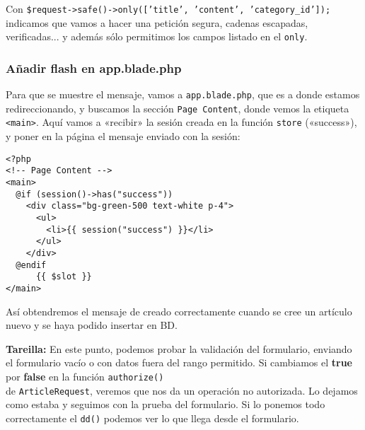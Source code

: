\documentclass[11pt]{article}
\begin{document}
Con \texttt{\$request->safe()->only(['title', 'content', 'category\_id']);}
indicamos que vamos a hacer una petición segura, cadenas escapadas,
verificadas... y además sólo permitimos los campos listado en el
\texttt{only}.


\subsubsection{Añadir flash en app.blade.php}
\label{sec:org750f89d}
Para que se muestre el mensaje, vamos a \texttt{app.blade.php}, que es a
donde estamos redireccionando, y buscamos la sección \texttt{Page Content},
donde vemos la etiqueta \texttt{<main>}. Aquí vamos a «recibir» la sesión
creada en la función \texttt{store} («success»), y poner en la página el
mensaje enviado con la sesión:
\begin{verbatim}
<?php
<!-- Page Content -->
<main>
  @if (session()->has("success"))
    <div class="bg-green-500 text-white p-4">
      <ul>
        <li>{{ session("success") }}</li>
      </ul>
    </div>
  @endif
      {{ $slot }}
</main>
\end{verbatim}

Así obtendremos el mensaje de creado correctamente cuando se cree un
artículo nuevo y se haya podido insertar en BD.



\textbf{Tareilla:} En este punto, podemos probar la validación del
formulario, enviando el formulario vacío o con datos fuera del rango
permitido.  Si cambiamos el \textbf{true} por \textbf{false} en la función
\texttt{authorize()} \\
de \texttt{ArticleRequest}, veremos que nos da un operación no autorizada.
Lo dejamos como estaba y seguimos con la prueba del formulario. Si lo
ponemos todo correctamente el \texttt{dd()} podemos ver lo que llega desde el
formulario.



\newpage
\end{document}
